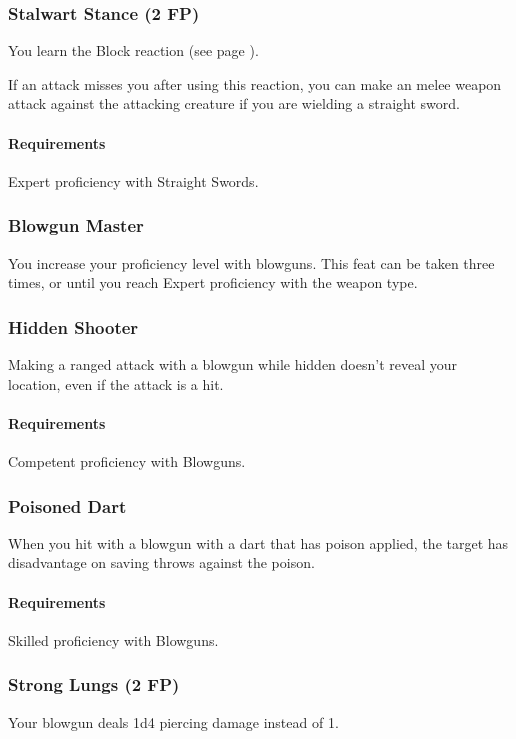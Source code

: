 \subsubsection{Stalwart Stance (2 FP)} \label{feat::stalwartstance}
    You learn the Block reaction (see page \pageref{act::block}).

    If an attack misses you after using this reaction, you can make an melee weapon attack against the attacking creature if you are wielding a straight sword.
    \paragraph{Requirements} Expert proficiency with Straight Swords.

\subsubsection{Blowgun Master} \label{feat::blowgunmaster}
    You increase your proficiency level with blowguns.
    This feat can be taken three times, or until you reach Expert proficiency with the weapon type.
\subsubsection{Hidden Shooter} \label{feat::hiddenshooter}
    Making a ranged attack with a blowgun while hidden doesn't reveal your location, even if the attack is a hit.
    \paragraph{Requirements} Competent proficiency with Blowguns.
\subsubsection{Poisoned Dart} \label{feat::poisoneddart}
    When you hit with a blowgun with a dart that has poison applied, the target has disadvantage on saving throws against the poison.
    \paragraph{Requirements} Skilled proficiency with Blowguns.
\subsubsection{Strong Lungs (2 FP)} \label{feat::stronglungs}
    Your blowgun deals 1d4 piercing damage instead of 1.

